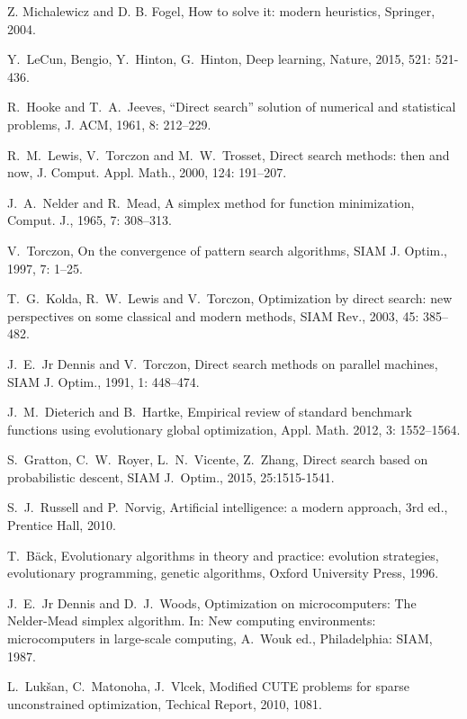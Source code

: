 \documentclass[final,1p,times]{elsarticle}
\begin{document}
\begin{thebibliography}{99}
Z. Michalewicz and D. B. Fogel, How to solve it: modern
heuristics, Springer, 2004.

Y.~LeCun, Bengio, Y.~Hinton, G.~Hinton, Deep learning, Nature,
2015, 521: 521-436.

R.~Hooke and T.~A.~Jeeves,
``Direct search'' solution of numerical and statistical problems,
{J. ACM}, 1961, 8: 212--229.

R.~M.~Lewis, V.~Torczon and M.~W.~Trosset,
Direct search methods: then and now,
{J. Comput. Appl. Math.},
2000, 124: 191--207.

J.~A.~Nelder and R.~Mead,
A simplex method for function minimization,
{Comput. J.}, 1965, 7: 308--313.

V.~Torczon,
On the convergence of pattern search algorithms,
{SIAM J. Optim.}, 1997, 7: 1--25.

T.~G.~Kolda, R.~W.~Lewis and V.~Torczon,
Optimization by direct search: new perspectives on some classical
and modern methods,
{SIAM Rev.}, 2003, 45: 385--482.

J.~E.~Jr Dennis and V.~Torczon,
Direct search methods on parallel machines,
{SIAM J. Optim.}, 1991, 1: 448--474.

J.~M.~Dieterich and B.~Hartke, 
Empirical review of standard benchmark functions using evolutionary global optimization,
{Appl. Math.} 2012, 3: 1552--1564.

S.~Gratton, C.~W.~Royer, L.~N.~Vicente, Z.~Zhang, Direct search
based on probabilistic descent, SIAM J.~Optim., 
2015, 25:1515-1541.

S.~J.~Russell and P.~Norvig,  Artificial intelligence: a modern
approach, 3rd ed., Prentice Hall, 2010.

T.~B{\"a}ck, 
Evolutionary algorithms in theory and practice: evolution
  strategies, evolutionary programming, genetic algorithms,
Oxford University Press, 1996.

J.~E.~Jr Dennis and D.~J.~Woods,
Optimization on microcomputers: The Nelder-Mead simplex algorithm.
In: New computing environments: microcomputers in large-scale
computing, A.~Wouk ed., Philadelphia: SIAM, 1987.

L.~Luk{\v{s}}an, C.~Matonoha, J.~Vlcek,
Modified CUTE problems for sparse unconstrained optimization,
Techical Report,
2010, 1081.


\end{thebibliography}
\end{document}
